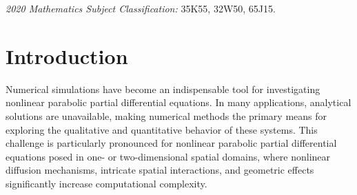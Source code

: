 \documentclass[final,12pt,3p]{elsarticle}
\theoremstyle{plain}
\theoremstyle{definition}
\theoremstyle{remark}
\begin{document}
\begin{frontmatter}
\begin{keyword}
\emph{2020 Mathematics Subject Classification:} 35K55, 32W50, 65J15.
\end{keyword}



\end{frontmatter}


\section{Introduction}\label{S1}
Numerical simulations have become an indispensable tool for investigating nonlinear parabolic partial differential equations. 
In many applications, analytical solutions are unavailable, making numerical methods the primary means for exploring the qualitative and quantitative behavior of these systems. 
This challenge is particularly pronounced for nonlinear parabolic partial differential equations posed in one- or two-dimensional spatial domains, where nonlinear diffusion mechanisms, intricate spatial interactions, and geometric effects significantly increase computational complexity. 
\end{document}
